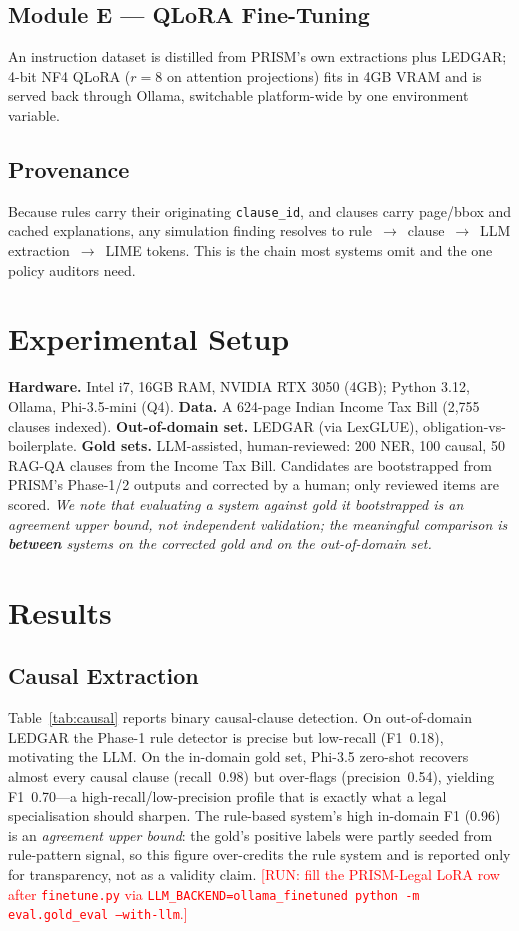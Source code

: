 \documentclass[conference]{IEEEtran}
\newcommand{\todo}[1]{\textcolor{red}{[#1]}}
\begin{document}
\subsection{Module E --- QLoRA Fine-Tuning}
An instruction dataset is distilled from PRISM's own extractions plus LEDGAR;
4-bit NF4 QLoRA ($r{=}8$ on attention projections) fits in 4GB VRAM and is
served back through Ollama, switchable platform-wide by one environment
variable.

\subsection{Provenance}
Because rules carry their originating \texttt{clause\_id}, and clauses carry
page/bbox and cached explanations, any simulation finding resolves to
rule~$\rightarrow$~clause~$\rightarrow$~LLM extraction~$\rightarrow$~LIME
tokens. This is the chain most systems omit and the one policy auditors need.

\section{Experimental Setup}
\textbf{Hardware.} Intel i7, 16GB RAM, NVIDIA RTX 3050 (4GB); Python 3.12,
Ollama, Phi-3.5-mini (Q4). \textbf{Data.} A 624-page Indian Income Tax Bill
(2{,}755 clauses indexed). \textbf{Out-of-domain set.} LEDGAR (via LexGLUE),
obligation-vs-boilerplate. \textbf{Gold sets.} LLM-assisted, human-reviewed:
200 NER, 100 causal, 50 RAG-QA clauses from the Income Tax Bill. Candidates are
bootstrapped from PRISM's Phase-1/2 outputs and corrected by a human; only
reviewed items are scored. \emph{We note that evaluating a system against gold
it bootstrapped is an agreement upper bound, not independent validation; the
meaningful comparison is \textbf{between} systems on the corrected gold and on
the out-of-domain set.}

\section{Results}

\subsection{Causal Extraction}
Table~\ref{tab:causal} reports binary causal-clause detection. On out-of-domain
LEDGAR the Phase-1 rule detector is precise but low-recall (F1~0.18),
motivating the LLM. On the in-domain gold set, Phi-3.5 zero-shot recovers almost
every causal clause (recall~0.98) but over-flags (precision~0.54), yielding
F1~0.70---a high-recall/low-precision profile that is exactly what a legal
specialisation should sharpen. The rule-based system's high in-domain F1 (0.96)
is an \emph{agreement upper bound}: the gold's positive labels were partly
seeded from rule-pattern signal, so this figure over-credits the rule system
and is reported only for transparency, not as a validity claim. \todo{RUN: fill
the PRISM-Legal LoRA row after \texttt{finetune.py} via
\texttt{LLM\_BACKEND=ollama\_finetuned python -m eval.gold\_eval --with-llm}.}
\end{document}
